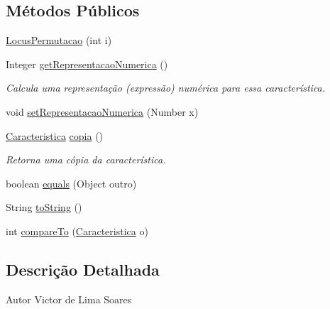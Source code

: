 \subsection*{Métodos Públicos}
\begin{DoxyCompactItemize}
\item 
\hyperlink{classic_1_1populacional_1_1seres_1_1permutacao_1_1_locus_permutacao_a2b1d0fdb86490b6d5ecd715563a46d38}{Locus\-Permutacao} (int i)
\item 
Integer \hyperlink{classic_1_1populacional_1_1seres_1_1permutacao_1_1_locus_permutacao_a0e451821af43f1f6e2da99d7c0c0f18e}{get\-Representacao\-Numerica} ()
\begin{DoxyCompactList}\small\item\em Calcula uma representação (expressão) numérica para essa característica. \end{DoxyCompactList}\item 
void \hyperlink{classic_1_1populacional_1_1seres_1_1permutacao_1_1_locus_permutacao_a64928060d205a3c0ced139d468a314be}{set\-Representacao\-Numerica} (Number x)
\item 
\hyperlink{interfaceic_1_1populacional_1_1_caracteristica}{Caracteristica} \hyperlink{classic_1_1populacional_1_1seres_1_1permutacao_1_1_locus_permutacao_a1f988e306c66b686cc0aeaa71f7b8d4a}{copia} ()
\begin{DoxyCompactList}\small\item\em Retorna uma cópia da característica. \end{DoxyCompactList}\item 
boolean \hyperlink{classic_1_1populacional_1_1seres_1_1permutacao_1_1_locus_permutacao_af662735591d636678c7eeafda9d1ed92}{equals} (Object outro)
\item 
String \hyperlink{classic_1_1populacional_1_1seres_1_1permutacao_1_1_locus_permutacao_a95d99f0076e154cfc042f105ee714307}{to\-String} ()
\item 
int \hyperlink{classic_1_1populacional_1_1seres_1_1permutacao_1_1_locus_permutacao_a231a82fff1c9415ed00698a7165859d9}{compare\-To} (\hyperlink{interfaceic_1_1populacional_1_1_caracteristica}{Caracteristica} o)
\end{DoxyCompactItemize}


\subsection{Descrição Detalhada}
\begin{DoxyAuthor}{Autor}
Victor de Lima Soares 
\end{DoxyAuthor}


